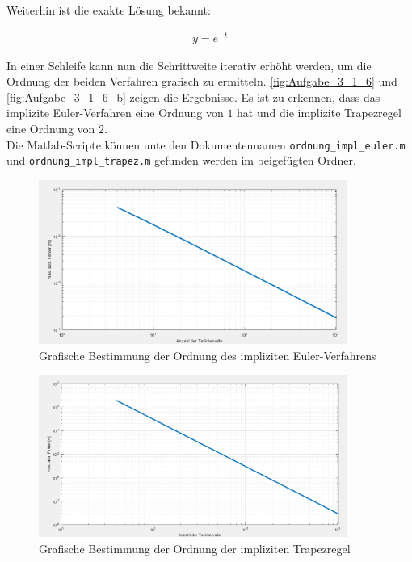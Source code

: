 \documentclass[
	pagesize,
	fontsize=12pt,
	paper=a4,
	oneside,
   reqno
]{scrartcl}
\begin{document}
Weiterhin ist die exakte Lösung bekannt:

\begin{align*}
   y = e^{-t}
\end{align*}

In einer Schleife kann nun die Schrittweite iterativ erhöht werden, um die Ordnung der beiden Verfahren grafisch zu ermitteln. \autoref{fig:Aufgabe_3_1_6} und \autoref{fig:Aufgabe_3_1_6_b} zeigen die Ergebnisse. Es ist zu erkennen, dass das implizite Euler-Verfahren eine Ordnung von $1$ hat und die implizite Trapezregel eine Ordnung von $2$.\\
Die Matlab-Scripte können unte den Dokumentennamen \texttt{ordnung\_impl\_euler.m} und \texttt{ordnung\_impl\_trapez.m} gefunden werden im beigefügten Ordner.

\begin{figure}[H]
   \centering
   \includegraphics[width=0.9\textwidth]{Bilder/Aufgabe_3_1_6.png}
   \caption[Ordnung impl. Euler-Verfahren]{Grafische Bestimmung der Ordnung des impliziten Euler-Verfahrens}
   \label{fig:Aufgabe_3_1_6}
\end{figure}

\begin{figure}[H]
   \centering
   \includegraphics[width=0.9\textwidth]{Bilder/Aufgabe_3_1_6_b.png}
   \caption[Ordnung impl. Trapezregel]{Grafische Bestimmung der Ordnung der impliziten Trapezregel}
   \label{fig:Aufgabe_3_1_6_b}
\end{figure}
\end{document}
